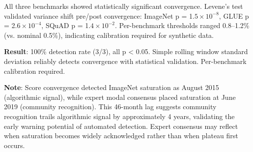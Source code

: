 
All three benchmarks showed statistically significant convergence. Levene's test validated variance shift pre/post convergence: ImageNet p = 1.$5\times 10^{-8}$, GLUE p = 2.$6\times 10^{-4}$, SQuAD p = 1.$4\times 10^{-2}$. Per-benchmark thresholds ranged 0.8--1.2\% (vs. nominal 0.5\%), indicating calibration required for synthetic data.

\begin{table}[htbp]
\centering
{}
\end{table}

\textbf{Result}: 100\% detection rate (3/3), all p < 0.05. Simple rolling window standard deviation reliably detects convergence with statistical validation. Per-benchmark calibration required.

\textbf{Note}: Score convergence detected ImageNet saturation as August 2015 (algorithmic signal), while expert modal consensus placed saturation at June 2019 (community recognition). This 46-month lag suggests community recognition trails algorithmic signal by approximately 4 years, validating the early warning potential of automated detection. Expert consensus may reflect when saturation becomes widely acknowledged rather than when plateau first occurs.
